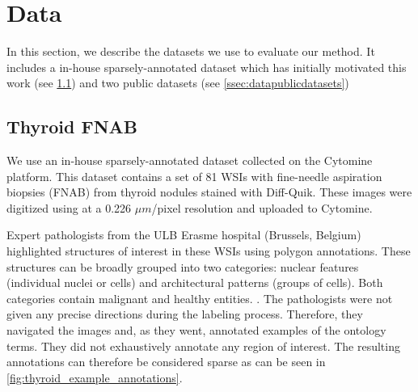 \section{Data}
\label{sec:data}
In this section, we describe the datasets we use to evaluate our method. It includes a in-house sparsely-annotated dataset which has initially motivated this work (see \cref{ssec:thyroidfnab}) and two public datasets (see \cref{ssec:datapublicdatasets})



\subsection{Thyroid FNAB}
\label{ssec:thyroidfnab}

We use an in-house sparsely-annotated dataset collected on the Cytomine platform. This dataset contains a set of 81 WSIs with fine-needle aspiration biopsies (FNAB) from thyroid nodules stained with Diff-Quik. These images were digitized using  at a 0.226 $\mu m$/pixel resolution and uploaded to Cytomine. 

Expert pathologists from the ULB Erasme hospital (Brussels, Belgium) highlighted structures of interest in these WSIs using polygon annotations. These structures can be broadly grouped into two categories: nuclear features (individual nuclei or cells) and architectural patterns (groups of cells). Both categories contain malignant and healthy entities. . The pathologists were not given any precise directions during the labeling process. Therefore, they navigated the images and, as they went, annotated examples of the ontology terms. They did not exhaustively annotate any region of interest. The resulting annotations can therefore be considered sparse as can be seen in \cref{fig:thyroid_example_annotations}. 

\begin{figure*}
  \centering
  \hspace{3pt}
  \hspace{3pt}
  \hspace{3pt}
  \caption{Example annotations of nuclear features and architectural patterns captured on Cytomine. Notice the sparseness of the annotations.}
  \label{fig:thyroid_example_annotations}
\end{figure*}

